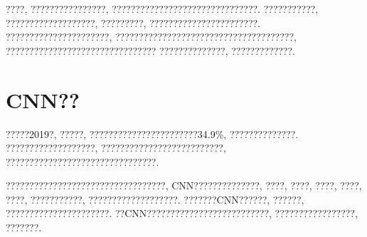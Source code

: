 \documentclass[lang=cn,11pt]{elegantpaper}
\begin{document}
????, ????????????????, ???????????????????????????????. ???????????, ???????????????????, ?????????, ???????????????????????. ??????????????????????, ??????????????????????????????????????, ???????????????????????????????? ??????????????, ?????????????.

\section{CNN??}
?????2019?, ?????, ???????????????????????34.9\%, ??????????????. ???????????????????, ??????????????????????????, ????????????????????????????????. 

??????????????????????????????????, CNN??????????????, ????, ????, ????, ????, ????, ???????????, ???????????????????. ???????CNN??????, ??????, ??????????????????????. ??CNN??????????????????????????, ?????????????????, ???????. 

\newpage
\nocite{*}



\end{document}
